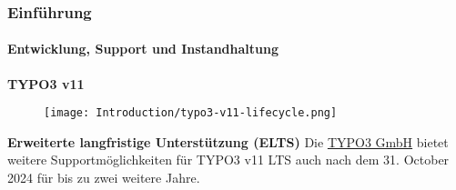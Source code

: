 %

\begin{frame}[fragile]
	\frametitle{Einführung}
	\framesubtitle{Entwicklung, Support und Instandhaltung}

	\textbf{TYPO3 v11}

	\begin{figure}
		\texttt{[image: Introduction/typo3-v11-lifecycle.png]}
	\end{figure}

	\textbf{Erweiterte langfristige Unterstützung (ELTS)}\newline
	\smaller
		Die \href{https://typo3.com}{TYPO3 GmbH} bietet weitere Supportmöglichkeiten
		für TYPO3 v11 LTS auch nach dem 31. October 2024 für bis zu zwei weitere Jahre.
	\normalsize

\end{frame}


